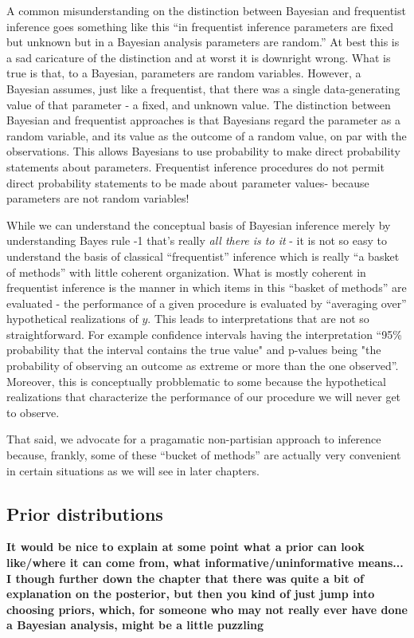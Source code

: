 A common misunderstanding on the distinction between Bayesian and frequentist inference goes something like this ``in frequentist inference parameters are fixed but unknown but in a Bayesian analysis parameters are random.'' At best this is a sad caricature of the distinction and at worst it is downright wrong. What is true is that, to a Bayesian, parameters are random variables. However, a Bayesian assumes, just like a frequentist, that there was a single data-generating value of that parameter - a fixed, and unknown value.  The distinction between Bayesian and frequentist approaches is that Bayesians regard the parameter as a random variable, and its value as the outcome of a random value, on par with the observations. This allows Bayesians to use probability to make direct probability statements about parameters. Frequentist inference procedures do not permit direct probability statements to be made about parameter values- because parameters are not random variables!

While we can understand the conceptual basis of Bayesian inference
merely by understanding Bayes rule -1 that's really {\it all there is
  to it} - it is not so easy to understand the basis of  classical
``frequentist'' inference which is really ``a basket of methods'' with
little coherent organization. What is mostly coherent in frequentist
inference is the manner in which items in this ``basket of methods''
are evaluated - the performance of a given procedure is evaluated by
``averaging over'' hypothetical realizations of $y$. This leads to
interpretations that are not so straightforward. For example
confidence intervals having the interpretation ``95\% probability that the interval contains the true value" and p-values being "the probability of observing an outcome as extreme or more than the one observed''. Moreover, this is conceptually probblematic to some because the hypothetical realizations that characterize the performance of our procedure we will never get to observe.  

That said,  we advocate for a pragamatic non-partisian approach to inference because, frankly,  some of these ``bucket of methods'' are actually very convenient in certain situations as we will see in later chapters.


\subsection{Prior distributions}
{\bf It would be nice to explain at some point what a prior can look like/where it can come from, what informative/uninformative means... I though further down the chapter that there was quite a bit of explanation on the posterior, but then you kind of just jump into choosing priors, which, for someone who may not really ever have done a Bayesian analysis, might be a little puzzling }

